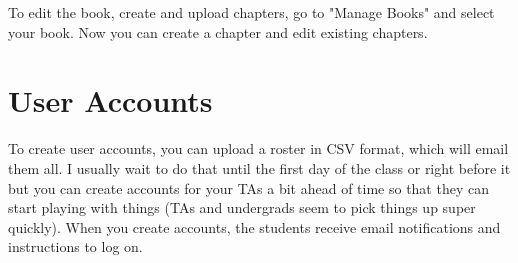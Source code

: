 \begin{gram}
To edit the book, create and upload chapters, go to "Manage Books" and select your book.  Now you can create a chapter and edit existing chapters.
\end{gram}

 

\section{User Accounts} 

\begin{gram}[Creation]
To create user accounts, you can upload a roster in CSV format, which will email them all.  I usually wait to do that until the first day of the class or right before it but you can create accounts for your TAs a bit ahead of time so that they can start playing with things (TAs and undergrads seem to pick things up super quickly).  When you create accounts, the students receive email notifications and instructions to log on.
\end{gram}

